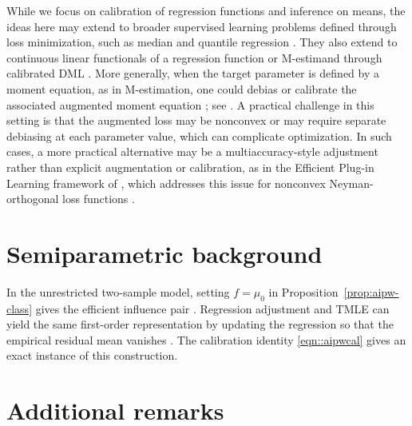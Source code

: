 \documentclass{article}
\theoremstyle{plain}
\theoremstyle{definition}
\newcommand{\1}{\mathbbm{1}}
\begin{document}
  While we focus on calibration of regression functions and inference on means, the ideas here may extend to broader supervised learning problems defined through loss minimization, such as median and quantile regression \citep{rosenblum2009using,noarov2023statistical,jung2021moment,roth2022uncertain,whitehouse2024orthogonal}. They also extend to continuous linear functionals of a regression function or M-estimand through calibrated DML \citep{van2024automatic,van2025automatic}. More generally, when the target parameter is defined by a moment equation, as in M-estimation, one could debias or calibrate the associated augmented moment equation \citep{vanderlaanunified,DoubleML}; see \citet{ji2025predictions}. A practical challenge in this setting is that the augmented loss may be nonconvex or may require separate debiasing at each parameter value, which can complicate optimization. In such cases, a more practical alternative may be a multiaccuracy-style adjustment rather than explicit augmentation or calibration, as in the Efficient Plug-in Learning framework of \citet{van2024combining}, which addresses this issue for nonconvex Neyman-orthogonal loss functions \citep{foster2023orthogonal}.




\appendix

\tableofcontents

\section{Semiparametric background}
\label{section::plugin}

In the unrestricted two-sample model, setting \(f=\mu_0\) in
Proposition~\ref{prop:aipw-class} gives the efficient influence pair
\citep{robins1995analysis,robins1995semiparametric,tsiatis2006semiparametric}.
Regression adjustment and TMLE can yield the same first-order representation
by updating the regression so that the empirical residual mean vanishes
\citep{scharfstein1999adjusting,van2006targeted,rosenblum2009using}.
The calibration identity \eqref{eqn::aipwcal} gives an exact instance of this construction.

\section{Additional remarks}

\label{appendix:remarks}
\end{document}
